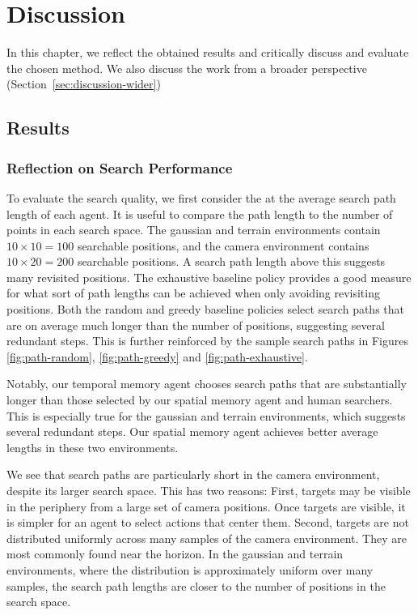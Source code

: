 \chapter{Discussion}
\label{cha:discussion}

In this chapter, we reflect the obtained results and critically discuss and evaluate the chosen method.
We also discuss the work from a broader perspective (Section~\ref{sec:discussion-wider})

\section{Results}
\label{sec:discussion-results}

\subsection{Reflection on Search Performance}

To evaluate the search quality, we first consider the at the average search path length of each agent.
It is useful to compare the path length to the number of points in each search space.
The gaussian and terrain environments contain \(10 \times 10 = 100\) searchable positions, and the camera environment contains \(10 \times 20 = 200\) searchable positions.
A search path length above this suggests many revisited positions.
The exhaustive baseline policy provides a good measure for what sort of path lengths can be achieved when only avoiding revisiting positions.
Both the random and greedy baseline policies select search paths that are on average much longer than the number of positions, suggesting several redundant steps.
This is further reinforced by the sample search paths in Figures \ref{fig:path-random}, \ref{fig:path-greedy} and \ref{fig:path-exhaustive}.

Notably, our temporal memory agent chooses search paths that are substantially longer than those selected by our spatial memory agent and human searchers.
This is especially true for the gaussian and terrain environments, which suggests several redundant steps.
Our spatial memory agent achieves better average lengths in these two environments.

We see that search paths are particularly short in the camera environment,
despite its larger search space.
This has two reasons:
First, targets may be visible in the periphery from a large set of camera positions.
Once targets are visible, it is simpler for an agent to select actions that center them.
Second, targets are not distributed uniformly across many samples of the camera environment.
They are most commonly found near the horizon.
In the gaussian and terrain environments, where the distribution is approximately uniform over many samples, the search path lengths are closer to the number of positions in the search space.

